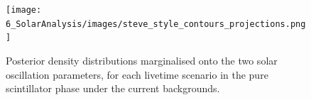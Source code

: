 \begin{figure}
    \centering
    \texttt{[image: 6\_SolarAnalysis/images/steve\_style\_contours\_projections.png]}
    \caption[Posterior density posterior distributions marginalised onto the two solar oscillation parameters, for each livetime scenario]
    {Posterior density distributions marginalised onto the two solar oscillation parameters, for each livetime scenario in the pure scintillator phase under the current backgrounds.}
    \label{fig:2d_posteriors_projections}
\end{figure}




